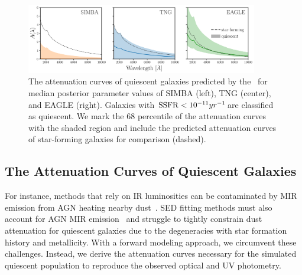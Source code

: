 \begin{figure}
\begin{center}
    \includegraphics[width=0.9\textwidth]{figs/abc_q_atten_unnorm.pdf}
    \caption{\label{fig:q_raw_atten}
    The attenuation curves of quiescent galaxies predicted by the \eda~for
    median posterior parameter values of SIMBA (left), TNG (center), and
    EAGLE (right).
    Galaxies with ${\rm SSFR} < 10^{-11}yr^{-1}$are classified as quiescent.
    We mark the 68 percentile of the attenuation curves with the shaded region
    and include the predicted attenuation curves of star-forming galaxies for
    comparison (dashed). 
    }
\end{center}
\end{figure}
\subsection{The Attenuation Curves of Quiescent Galaxies}  
For instance, methods that rely on IR luminosities can be contaminated by MIR
emission from AGN heating nearby dust~\citep{kirkpatrick2015}. 
SED fitting methods must also account for AGN MIR
emission~\citep{salim2016, leja2018, salim2018} and struggle to tightly
constrain dust attenuation for quiescent galaxies due to the degeneracies
with star formation history and metallicity.
With a forward modeling approach, we circumvent these challenges. 
Instead, we derive the attenuation curves necessary for the simulated quiescent
population to reproduce the observed optical and UV photometry. 

